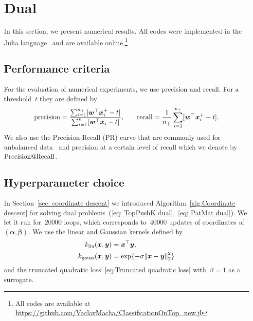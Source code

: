 \section{Dual}\label{sec:Numerical experiments}

In this section, we present numerical results. All codes were implemented in the Julia language~\cite{bezanson2017julia} and are available online.\footnote{All codes are available at \url{https://github.com/VaclavMacha/ClassificationOnTop_new.jl}}

\subsection{Performance criteria}

For the evaluation of numerical experiments, we use precision and recall. For a threshold~$t$ they are defined by
\begin{equation}\label{eq:prec_rec}
  \begin{alignedat}{2}
      \operatorname{precision}
      & = \frac{\sum_{i = 1}^{n_{+}} [\bm{w}^{\top}\bm{x}^+_{i} - t]}{\sum_{i = 1}^{n} [\bm{w}^{\top}\bm{x}_{i} - t]}, & \qquad
      \operatorname{recall}
      & = \frac{1}{n_{+}} \sum_{i = 1}^{n_{+}} [\bm{w}^{\top}\bm{x}^+_{i} - t].
  \end{alignedat}
\end{equation}
We also use the Precision-Recall (PR) curve that are commonly used for unbalanced data~\cite{davis2006relationship} and precision at a certain level of recall which we denote by~$\operatorname{Precision@Recall}$.

\subsection{Hyperparameter choice}

In Section~\ref{sec: coordinate descent} we introduced Algorithm~\ref{alg:Coordinate descent} for solving dual problems~(\ref{eq: TopPushK dual},~\ref{eq: PatMat dual}). We let it run for~$20000$ \repeatloop loops, which corresponds to~$40000$ updates of coordinates of~$(\bm{\alpha},\bm{\beta})$. We use the linear and Gaussian kernels defined by
\begin{align}
  k_{\textrm{lin}}(\bm{x}, \bm{y})   & = \bm{x}^{\top} \bm{y}, \label{eq:Linear kernel} \\
  k_{\textrm{gauss}}(\bm{x}, \bm{y}) & = \exp\{-\sigma \norm{\bm{x} - \bm{y}}_2^2\} \label{eq:Gaussian kernel}
\end{align}
and the truncated quadratic loss~\eqref{eq:Truncated quadratic loss} with~$\vartheta = 1$ as a surrogate. 

